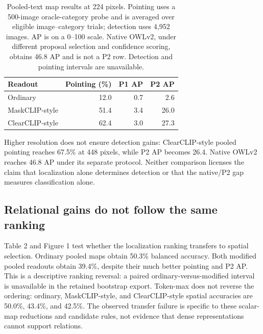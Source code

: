 \documentclass[10pt,twocolumn,letterpaper]{article}
\begin{document}
\begin{table}[tb]
\centering
\caption{Pooled-text map results at 224 pixels. Pointing uses a 500-image
oracle-category probe and is averaged over eligible image--category
trials; detection uses 4,952 images. AP is on a 0--100 scale. Native
OWLv2, under different proposal selection and confidence scoring,
obtains 46.8 AP and is not a P2 row. Detection and pointing intervals
are unavailable.}
\label{tab:1}
\begin{tabular}{@{}lrrr@{}}
\toprule
Readout & Pointing (\%) & P1 AP & P2 AP \\
\midrule
Ordinary & 12.0 & 0.7 & 2.6 \\
MaskCLIP-style & 51.4 & 3.4 & 26.0 \\
ClearCLIP-style & 62.4 & 3.0 & 27.3 \\
\bottomrule
\end{tabular}
\end{table}

Higher resolution does not ensure detection gains: ClearCLIP-style
pooled pointing reaches 67.5\% at 448 pixels, while P2 AP becomes 26.4.
Native OWLv2 reaches 46.8 AP under its separate protocol. Neither
comparison licenses the claim that localization alone determines
detection or that the native/P2 gap measures classification alone.

\subsection{Relational gains do not follow the same
ranking}\label{relational-gains-do-not-follow-the-same-ranking}

Table 2 and Figure 1 test whether the localization ranking transfers to
spatial selection. Ordinary pooled maps obtain 50.3\% balanced accuracy.
Both modified pooled readouts obtain 39.4\%, despite their much better
pointing and P2 AP. This is a descriptive ranking reversal: a paired
ordinary-versus-modified interval is unavailable in the retained
bootstrap export. Token-max does not reverse the ordering: ordinary,
MaskCLIP-style, and ClearCLIP-style spatial accuracies are 50.0\%,
43.4\%, and 42.5\%. The observed transfer failure is specific to these
scalar-map reductions and candidate rules, not evidence that dense
representations cannot support relations.
\end{document}
